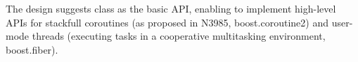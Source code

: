 The design suggests class \ectx as the basic API, enabling to implement
high-level APIs for stackfull coroutines (as proposed in N3985\cite{N3985},
boost.coroutine2\cite{bcoroutine2}) and user-mode threads (executing tasks in a
cooperative multitasking environment, boost.fiber\cite{bfiber}).

